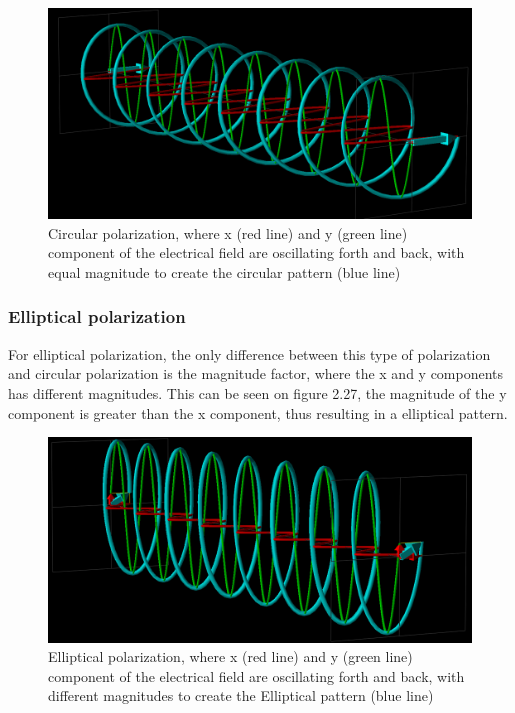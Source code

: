 \begin{figure}[h]
\centering
\includegraphics[scale=0.3]{figures/DetailedRightHandPolarization.PNG}
\caption{Circular polarization, where x (red line) and y (green line) component of the electrical field are oscillating forth and back, with equal magnitude to create the circular pattern (blue line)}
\end{figure}

\subsubsection{Elliptical polarization}
For elliptical polarization, the only difference between this type of polarization and circular polarization is the magnitude factor, where the x and y components has different magnitudes. This can be seen on figure 2.27, the magnitude of the y component is greater than the x component, thus resulting in a elliptical pattern.

\begin{figure}[h]
\centering
\includegraphics[scale=0.3]{figures/ellipticalPolarization.PNG}
\caption{Elliptical polarization, where x (red line) and y (green line) component of the electrical field are oscillating forth and back, with different magnitudes to create the Elliptical pattern (blue line)}
\end{figure}

